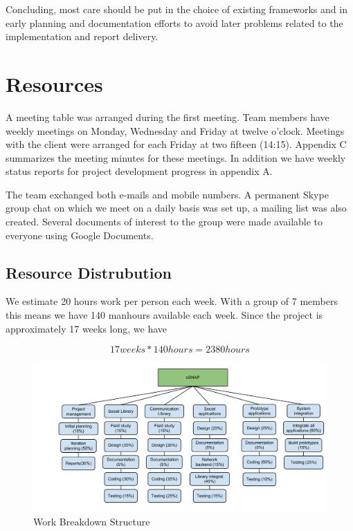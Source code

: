 Concluding, most care should be put in the choice of existing frameworks and in early planning
and documentation efforts to avoid later problems related to the implementation and report delivery.


\section{Resources}
A meeting table was arranged during the first meeting. Team members
have weekly meetings on Monday, Wednesday and Friday at twelve o'clock.
Meetings with the client were arranged for each Friday at two fifteen (14:15).
Appendix C summarizes the meeting minutes for these meetings. In addition we
have weekly status reports for project development progress in appendix A.

The team exchanged both e-mails and mobile numbers. A permanent Skype
group chat on which we meet on a daily basis was set up, a mailing
list was also created. Several documents of interest to the group
were made available to everyone using Google Documents.

\subsection{Resource Distrubution}
We estimate 20 hours work per person each week. With a group of 7 members this means we have
140 manhours available each week. Since the project is approximately 17 weeks long, we have

\begin{equation}
17 weeks * 140 hours = 2380 hours
\end{equation}


\begin{figure}[h]
\centering \includegraphics[width=1.1\textwidth]{img/mgmt-wbs.pdf} \caption{Work Breakdown Structure}
\label{fig:mgmt-wbs}
\end{figure}

